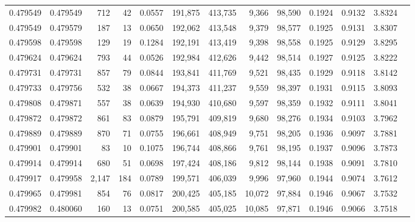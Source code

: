 \begin{tabular}{rrrrrrrrrrrrr}
0.479549 & 0.479549 &   712 &    42 &                                     0.0557 & 191,875 & 413,735 &   9,366 &  98,590 & 0.1924 & 0.9132 & 3.8324 \\
0.479549 & 0.479579 &   187 &    13 &                                     0.0650 & 192,062 & 413,548 &   9,379 &  98,577 & 0.1925 & 0.9131 & 3.8307 \\
0.479598 & 0.479598 &   129 &    19 &                                     0.1284 & 192,191 & 413,419 &   9,398 &  98,558 & 0.1925 & 0.9129 & 3.8295 \\
0.479624 & 0.479624 &   793 &    44 &                                     0.0526 & 192,984 & 412,626 &   9,442 &  98,514 & 0.1927 & 0.9125 & 3.8222 \\
0.479731 & 0.479731 &   857 &    79 &                                     0.0844 & 193,841 & 411,769 &   9,521 &  98,435 & 0.1929 & 0.9118 & 3.8142 \\
0.479733 & 0.479756 &   532 &    38 &                                     0.0667 & 194,373 & 411,237 &   9,559 &  98,397 & 0.1931 & 0.9115 & 3.8093 \\
0.479808 & 0.479871 &   557 &    38 &                                     0.0639 & 194,930 & 410,680 &   9,597 &  98,359 & 0.1932 & 0.9111 & 3.8041 \\
0.479872 & 0.479872 &   861 &    83 &                                     0.0879 & 195,791 & 409,819 &   9,680 &  98,276 & 0.1934 & 0.9103 & 3.7962 \\
0.479889 & 0.479889 &   870 &    71 &                                     0.0755 & 196,661 & 408,949 &   9,751 &  98,205 & 0.1936 & 0.9097 & 3.7881 \\
0.479901 & 0.479901 &    83 &    10 &                                     0.1075 & 196,744 & 408,866 &   9,761 &  98,195 & 0.1937 & 0.9096 & 3.7873 \\
0.479914 & 0.479914 &   680 &    51 &                                     0.0698 & 197,424 & 408,186 &   9,812 &  98,144 & 0.1938 & 0.9091 & 3.7810 \\
0.479917 & 0.479958 & 2,147 &   184 &                                     0.0789 & 199,571 & 406,039 &   9,996 &  97,960 & 0.1944 & 0.9074 & 3.7612 \\
0.479965 & 0.479981 &   854 &    76 &                                     0.0817 & 200,425 & 405,185 &  10,072 &  97,884 & 0.1946 & 0.9067 & 3.7532 \\
0.479982 & 0.480060 &   160 &    13 &                                     0.0751 & 200,585 & 405,025 &  10,085 &  97,871 & 0.1946 & 0.9066 & 3.7518 \\

\end{tabular}
